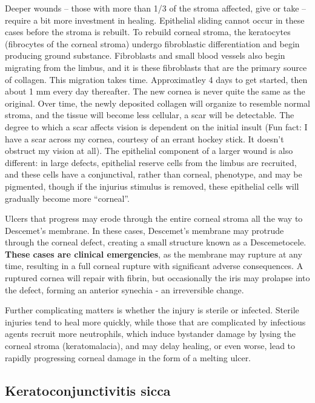 \documentclass[
  openany]{article}
\begin{document}
Deeper wounds -- those with more than 1/3 of the stroma affected, give or take -- require a bit more investment in healing. Epithelial sliding cannot occur in these cases before the stroma is rebuilt. To rebuild corneal stroma, the keratocytes (fibrocytes of the corneal stroma) undergo fibroblastic differentiation and begin producing ground substance. Fibroblasts and small blood vessels also begin migrating from the limbus, and it is these fibroblasts that are the primary source of collagen. This migration takes time. Approximatley 4 days to get started, then about 1 mm every day thereafter. The new cornea is never quite the same as the original. Over time, the newly deposited collagen will organize to resemble normal stroma, and the tissue will become less cellular, a scar will be detectable. The degree to which a scar affects vision is dependent on the initial insult (Fun fact: I have a scar across my cornea, courtesy of an errant hockey stick. It doesn't obstruct my vision at all). The epithelial component of a larger wound is also different: in large defects, epithelial reserve cells from the limbus are recruited, and these cells have a conjunctival, rather than corneal, phenotype, and may be pigmented, though if the injurius stimulus is removed, these epithelial cells will gradually become more ``corneal''.

Ulcers that progress may erode through the entire corneal stroma all the way to Descemet's membrane. In these cases, Descemet's membrane may protrude through the corneal defect, creating a small structure known as a Descemetocele. \textbf{These cases are clinical emergencies}, as the membrane may rupture at any time, resulting in a full corneal rupture with significant adverse consequences. A ruptured cornea will repair with fibrin, but occasionally the iris may prolapse into the defect, forming an anterior synechia - an irreversible change.

Further complicating matters is whether the injury is sterile or infected. Sterile injuries tend to heal more quickly, while those that are complicated by infectious agents recruit more neutrophils, which induce bystander damage by lysing the corneal stroma (keratomalacia), and may delay healing, or even worse, lead to rapidly progressing corneal damage in the form of a melting ulcer.

\hypertarget{keratoconjunctivitis-sicca}{%
\subsection{Keratoconjunctivitis sicca}\label{keratoconjunctivitis-sicca}}
\end{document}
